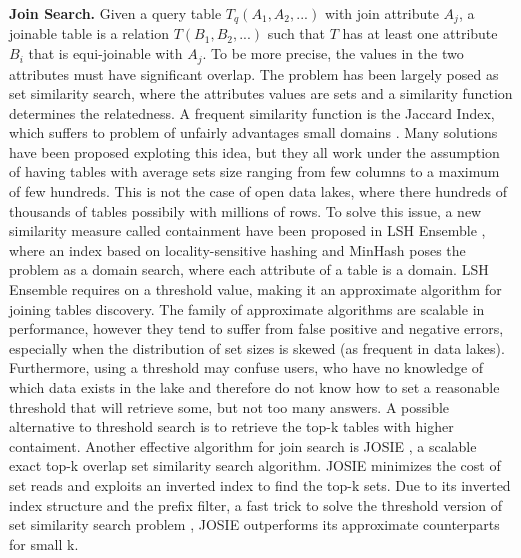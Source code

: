 \textbf{Join Search.} Given a query table $T_q(A_1,A_2,...)$ with join attribute $A_j$, a joinable table is a relation $T(B_1, B_2,...)$ such that $T$ has at least one attribute $B_i$ that is equi-joinable with $A_j$. To be more precise, the values in the two attributes must have significant overlap. The problem has been largely posed as set similarity search, where the attributes values are sets and a similarity function determines the relatedness. A frequent similarity function is the Jaccard Index, which suffers to problem of unfairly advantages small domains \cite{zhu2016lsh}. Many solutions have been proposed exploting this idea, but they all work under the assumption of having tables with average sets size ranging from few columns to a maximum of few hundreds. This is not the case of open data lakes, where there hundreds of thousands of tables possibily with millions of rows. To solve this issue, a new similarity measure called containment have been proposed in LSH Ensemble \cite{zhu2016lsh}, where an index based on locality-sensitive hashing \cite{gionis1999similarity} and MinHash \cite{indyk1998approximate} poses the problem as a domain search, where each attribute of a table is a domain. LSH Ensemble requires on a threshold value, making it an approximate algorithm for joining tables discovery. The family of approximate algorithms are scalable in performance, however they tend to suffer from false positive and negative errors, especially when the distribution of set sizes is skewed (as frequent in data lakes). Furthermore, using a threshold may confuse users, who have no knowledge of which data exists in the lake and therefore do not know how to set a reasonable threshold that will retrieve some, but not too many answers. A possible alternative to threshold search is to retrieve the top-k tables with higher contaiment. Another effective algorithm for join search is JOSIE \cite{zhu2019josie}, a scalable exact top-k overlap set similarity search algorithm. JOSIE minimizes the cost of set reads and exploits an inverted index to find the top-k sets. Due to its inverted index structure and the prefix filter, a fast trick to solve the threshold version of set similarity search problem \cite{chaudhuri2006primitive}, JOSIE outperforms its approximate counterparts for small k.
\bigbreak

